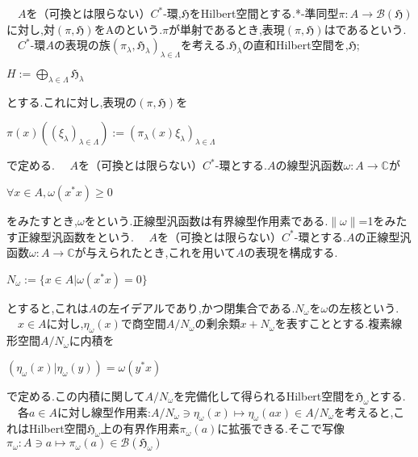 　$A$を（可換とは限らない）$C^*$-環,$\mathfrak{H}$をHilbert空間とする.*-準同型$\pi:A\rightarrow \mathcal{B}\left(\mathfrak{H}\right)$に対し,対$\left(\pi,\mathfrak{H}\right)$をAのという.$\pi$が単射であるとき,表現$\left(\pi,\mathfrak{H}\right)$はであるという.
　$C^*$-環$A$の表現の族$\left(\pi_{\lambda},\mathfrak{H}_{\lambda}\right)_{\lambda \in \Lambda}$を考える.$\mathfrak{H}_{\lambda}$の直和Hilbert空間を,$\mathfrak{H}$;
\begin{center}
$H:=\bigoplus_{\lambda \in \Lambda}\mathfrak{H}_{\lambda}$
\end{center}
とする.これに対し,表現の$\left(\pi,\mathfrak{H}\right)$を
\begin{center}
$\pi\left(x\right)\left(\left(\xi_{\lambda}\right)_{\lambda \in \Lambda}\right):=
\left(\pi_{\lambda}\left(x\right)\xi_{\lambda}\right)_{\lambda \in \Lambda}$
\end{center}
で定める.
　$A$を（可換とは限らない）$C^*$-環とする.$A$の線型汎函数$\omega:A\rightarrow \mathbb{C}$が
\begin{center}
$\forall x\in A,\omega \left(x^*x \right)\geq0$
\end{center}
をみたすとき,$\omega$をという.正線型汎函数は有界線型作用素である.$\parallel\omega\parallel$=1をみたす正線型汎函数をという.
　$A$を（可換とは限らない）$C^*$-環とする.$A$の正線型汎函数$\omega:A\rightarrow \mathbb{C}$が与えられたとき,これを用いて$A$の表現を構成する.
\begin{center}
$N_{\omega}:=\{x\in A|\omega\left(x^*x\right)=0 \}$
\end{center}
とすると,これは$A$の左イデアルであり,かつ閉集合である.$N_{\omega}$を$\omega$の左核という.\\
　$x\in A$に対し,$\eta_{\omega}\left(x\right)$で商空間$A/N_{\omega}$の剰余類$x+N_{\omega}$を表すこととする.複素線形空間$A/N_{\omega}$に内積を
\begin{center}
$\left(\eta_{\omega}\left(x\right)|\eta_{\omega}\left(y\right)\right)=\omega\left(y^*x\right)$
\end{center}
で定める.この内積に関して$A/N_{\omega}$を完備化して得られるHilbert空間を$\mathfrak{H}_{\omega}$とする.\\
　各$a\in A$に対し線型作用素:$A/N_{\omega}\ni \eta_{\omega}\left(x\right)\mapsto \eta_{\omega}\left(ax\right)\in A/N_{\omega}$を考えると,これはHilbert空間$\mathfrak{H}_{\omega}$上の有界作用素$\pi_{\omega}\left(a\right)$に拡張できる.そこで写像$\pi_{\omega}:A\ni a\mapsto \pi_{\omega}\left(a\right)\in \mathcal{B}\left(\mathfrak{H}_{\omega}\right)$
